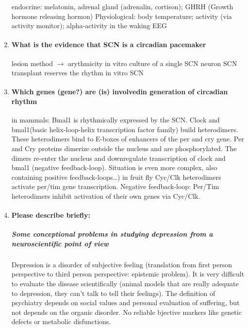 \documentclass[12pt,article,oneside,a4paper]{memoir}
\begin{document}
\begin{enumerate}
endocrine: melatonin, adrenal gland (adrenalin, cortison); GHRH (Growth hormone releasing hormon)
	Physiological: body temperature; activity (via activity monitor); alpha-activity in the waking EEG

\item \paragraph{What is the evidence that SCN is a circadian pacemaker}

lesion method $\rightarrow$ arythmicity
         in vitro culture of a single SCN neuron    
         SCN transplant reserves the rhythm
         in vitro SCN

\item \paragraph{Which genes (gene?) are (is) involvedin generation of circadian rhythm}

in mammals: Bmal1 is rhythmically expressed by the SCN. Clock and bmal1(basic helix-loop-helix transcription factor family) build heterodimers. These heterodimers bind to E-boxes of enhancers of the per and cry gene. Per and Cry proteins dimerize outside the nucleus and are phosphorylated. The dimers re-enter the nucleus and downregulate transcription of  clock and bmal1 (negative feedback-loop). Situation is even more complex, also containing positive feedback-loops…)
        in fruit fly Cyc/Clk heterodimers activate per/tim gene transcription. Negative feedback-loop: Per/Tim heterodimers inhibit activation of their own genes via Cyc/Clk.

\item \paragraph{Please describe briefly:} \subparagraph{Some conceptional problems in studying depression from a neuroscientific point of view} 

Depression is a disorder of subjective feeling (translation from first person perspective to third person perspective: epistemic problem). It is very difficult to evaluate the disease scientifically (animal models that are really adequate to depression, they can’t talk to tell their feelings). The definition of psychiatry depends on social values and personal evaluation of suffering, but not depends on the organic disorder. No reliable bjective markers like genetic defects or metabolic disfunctions.


\end{enumerate}
\end{document}
